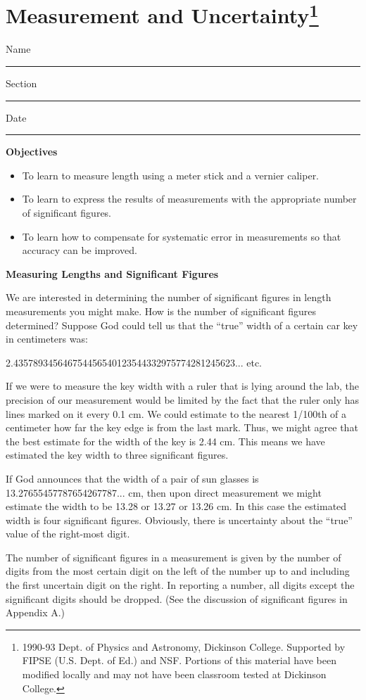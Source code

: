 
\section{Measurement and Uncertainty\footnote{
1990-93 Dept. of Physics and Astronomy, Dickinson College. Supported by FIPSE
(U.S. Dept. of Ed.) and NSF. Portions of this material have been modified locally
and may not have been classroom tested at Dickinson College.
}}

Name \rule{2.0in}{0.1pt}\hfill{}Section \rule{1.0in}{0.1pt}\hfill{}Date \rule{1.0in}{0.1pt}

\textbf{Objectives} 

\begin{itemize}
\item To learn to measure length using a meter stick and a vernier caliper. 
\item To learn to express the results of measurements with the appropriate number
of significant figures. 
\item To learn how to compensate for systematic error in measurements so that accuracy
can be improved.
\end{itemize}
\textbf{Measuring Lengths and Significant Figures} 

We are interested in determining the number of significant figures in length
measurements you might make. How is the number of significant figures determined?
Suppose God could tell us that the ``true'' width of a certain
car key in centimeters was:

2.435789345646754456540123544332975774281245623... etc. 

If we were to measure the key width with a ruler that is lying around the lab,
the precision of our measurement would be limited by the fact that the ruler
only has lines marked on it every 0.1 cm. We could estimate to the nearest 1/100th
of a centimeter how far the key edge is from the last mark. Thus, we might agree
that the best estimate for the width of the key is 2.44 cm. This means we have
estimated the key width to three significant figures. 

If God announces that the width of a pair of sun glasses is 13.27655457787654267787...
cm, then upon direct measurement we might estimate the width to be 13.28 or
13.27 or 13.26 cm. In this case the estimated width is four significant figures.
Obviously, there is uncertainty about the ``true'' value of
the right-most digit.

The number of significant figures in a measurement is given by the number of
digits from the most certain digit on the left of the number up to and including
the first uncertain digit on the right. In reporting a number, all digits except
the significant digits should be dropped. (See the discussion of significant
figures in Appendix A.)

